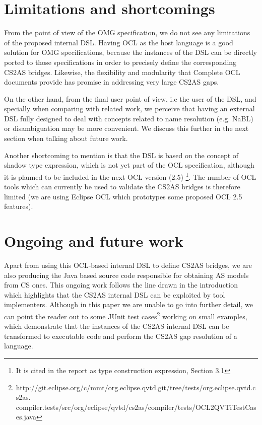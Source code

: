 \documentclass{llncs}
\begin{document}
\section{Limitations and shortcomings}
\label{sec:limitations}

From the point of view of the OMG specification, we do not see any limitations of the proposed internal DSL. Having OCL as the host language is a good solution for OMG specifications, because the instances of the DSL can be directly ported to those specifications in order to precisely define the corresponding CS2AS bridges. Likewise, the flexibility and modularity that Complete OCL documents provide has promise in addressing very large CS2AS gaps.

On the other hand, from the final user point of view, i.e the user of the DSL, and specially when comparing with related work, we perceive that having an external DSL fully designed to deal with concepts related to name resolution (e.g. NaBL) or disambiguation may be more convenient. We discuss this further in the next section when talking about future work.

Another shortcoming to mention is that the DSL is based on the concept of shadow type expression, which is not yet part of the OCL specification, although it is planned to be included in the next OCL version (2.5) \cite{brucker2013aachenReport}\footnote{It is cited in the report as type construction expression, Section 3.1}. The number of OCL tools which can currently be used to validate the CS2AS bridges is therefore limited (we are using Eclipse OCL\cite{eclipseOclOnline} which prototypes some proposed OCL 2.5 features).

\section{Ongoing and future work}
\label{sec:futureWork}

Apart from using this OCL-based internal DSL to define CS2AS bridges, we are also producing the Java based source code responsible for obtaining AS models from CS ones. This ongoing work follows  the line drawn in the introduction which highlights that the CS2AS internal DSL can be exploited by tool implementers. Although in this paper we are unable to go into further detail, we can point the reader out to some JUnit test cases\footnote{http://git.eclipse.org/c/mmt/org.eclipse.qvtd.git/tree/tests/org.eclipse.qvtd.cs2as.
compiler.tests/src/org/eclipse/qvtd/cs2as/compiler/tests/OCL2QVTiTestCases.java} working on small examples, which demonstrate that the instances of the CS2AS internal DSL can be transformed to executable code and perform the CS2AS gap resolution of a language.
\end{document}
